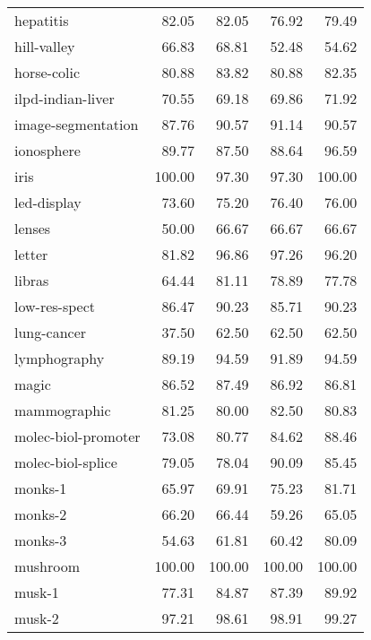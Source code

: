 \begin{longtable}{lrrrr}
                     hepatitis &   82.05 &    82.05 &  76.92 &  79.49 \\
                   hill-valley &   66.83 &    68.81 &  52.48 &  54.62 \\
                   horse-colic &   80.88 &    83.82 &  80.88 &  82.35 \\
             ilpd-indian-liver &   70.55 &    69.18 &  69.86 &  71.92 \\
            image-segmentation &   87.76 &    90.57 &  91.14 &  90.57 \\
                    ionosphere &   89.77 &    87.50 &  88.64 &  96.59 \\
                          iris &  100.00 &    97.30 &  97.30 & 100.00 \\
                   led-display &   73.60 &    75.20 &  76.40 &  76.00 \\
                        lenses &   50.00 &    66.67 &  66.67 &  66.67 \\
                        letter &   81.82 &    96.86 &  97.26 &  96.20 \\
                        libras &   64.44 &    81.11 &  78.89 &  77.78 \\
                 low-res-spect &   86.47 &    90.23 &  85.71 &  90.23 \\
                   lung-cancer &   37.50 &    62.50 &  62.50 &  62.50 \\
                  lymphography &   89.19 &    94.59 &  91.89 &  94.59 \\
                         magic &   86.52 &    87.49 &  86.92 &  86.81 \\
                  mammographic &   81.25 &    80.00 &  82.50 &  80.83 \\
           molec-biol-promoter &   73.08 &    80.77 &  84.62 &  88.46 \\
             molec-biol-splice &   79.05 &    78.04 &  90.09 &  85.45 \\
                       monks-1 &   65.97 &    69.91 &  75.23 &  81.71 \\
                       monks-2 &   66.20 &    66.44 &  59.26 &  65.05 \\
                       monks-3 &   54.63 &    61.81 &  60.42 &  80.09 \\
                      mushroom &  100.00 &   100.00 & 100.00 & 100.00 \\
                        musk-1 &   77.31 &    84.87 &  87.39 &  89.92 \\
                        musk-2 &   97.21 &    98.61 &  98.91 &  99.27 \\

\end{longtable}
